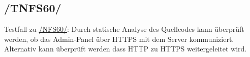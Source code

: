 \subsection*{/TNFS60/}
\label{/TNFS60/} Testfall zu \hyperref[/NFS60/]{/NFS60/}: Durch \gls{statische Analyse} des \Gls{Quellcode}s kann überprüft werden, ob das \Gls{Admin-Panel} über \Gls{HTTPS} mit dem \Gls{Server} kommuniziert.
Alternativ kann überprüft werden dass \Gls{HTTP} zu \Gls{HTTPS} weitergeleitet wird.